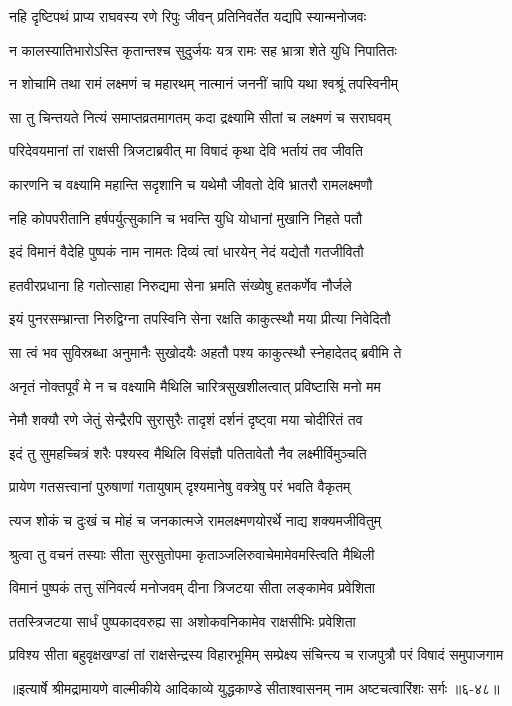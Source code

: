 \twolineshloka
{नहि दृष्टिपथं प्राप्य राघवस्य रणे रिपुः}
{जीवन् प्रतिनिवर्तेत यद्यपि स्यान्मनोजवः} %

\twolineshloka
{न कालस्यातिभारोऽस्ति कृतान्तश्च सुदुर्जयः}
{यत्र रामः सह भ्रात्रा शेते युधि निपातितः} %

\twolineshloka
{न शोचामि तथा रामं लक्ष्मणं च महारथम्}
{नात्मानं जननीं चापि यथा श्वश्रूं तपस्विनीम्} %

\twolineshloka
{सा तु चिन्तयते नित्यं समाप्तव्रतमागतम्}
{कदा द्रक्ष्यामि सीतां च लक्ष्मणं च सराघवम्} %

\twolineshloka
{परिदेवयमानां तां राक्षसी त्रिजटाब्रवीत्}
{मा विषादं कृथा देवि भर्तायं तव जीवति} %

\twolineshloka
{कारणनि च वक्ष्यामि महान्ति सदृशानि च}
{यथेमौ जीवतो देवि भ्रातरौ रामलक्ष्मणौ} %

\twolineshloka
{नहि कोपपरीतानि हर्षपर्युत्सुकानि च}
{भवन्ति युधि योधानां मुखानि निहते पतौ} %

\twolineshloka
{इदं विमानं वैदेहि पुष्पकं नाम नामतः}
{दिव्यं त्वां धारयेन् नेदं यद्येतौ गतजीवितौ} %

\twolineshloka
{हतवीरप्रधाना हि गतोत्साहा निरुद्यमा}
{सेना भ्रमति संख्येषु हतकर्णेव नौर्जले} %

\twolineshloka
{इयं पुनरसम्भ्रान्ता निरुद्विग्ना तपस्विनि}
{सेना रक्षति काकुत्स्थौ मया प्रीत्या निवेदितौ} %

\twolineshloka
{सा त्वं भव सुविस्रब्धा अनुमानैः सुखोदयैः}
{अहतौ पश्य काकुत्स्थौ स्नेहादेतद् ब्रवीमि ते} %

\twolineshloka
{अनृतं नोक्तपूर्वं मे न च वक्ष्यामि मैथिलि}
{चारित्रसुखशीलत्वात् प्रविष्टासि मनो मम} %

\twolineshloka
{नेमौ शक्यौ रणे जेतुं सेन्द्रैरपि सुरासुरैः}
{तादृशं दर्शनं दृष्ट्वा मया चोदीरितं तव} %

\twolineshloka
{इदं तु सुमहच्चित्रं शरैः पश्यस्व मैथिलि}
{विसंज्ञौ पतितावेतौ नैव लक्ष्मीर्विमुञ्चति} %

\twolineshloka
{प्रायेण गतसत्त्वानां पुरुषाणां गतायुषाम्}
{दृश्यमानेषु वक्त्रेषु परं भवति वैकृतम्} %

\twolineshloka
{त्यज शोकं च दुःखं च मोहं च जनकात्मजे}
{रामलक्ष्मणयोरर्थे नाद्य शक्यमजीवितुम्} %

\twolineshloka
{श्रुत्वा तु वचनं तस्याः सीता सुरसुतोपमा}
{कृताञ्जलिरुवाचेमामेवमस्त्विति मैथिली} %

\twolineshloka
{विमानं पुष्पकं तत्तु संनिवर्त्य मनोजवम्}
{दीना त्रिजटया सीता लङ्कामेव प्रवेशिता} %

\twolineshloka
{ततस्त्रिजटया सार्धं पुष्पकादवरुह्य सा}
{अशोकवनिकामेव राक्षसीभिः प्रवेशिता} %

\twolineshloka
{प्रविश्य सीता बहुवृक्षखण्डां तां राक्षसेन्द्रस्य विहारभूमिम्}
{सम्प्रेक्ष्य संचिन्त्य च राजपुत्रौ परं विषादं समुपाजगाम} %


॥इत्यार्षे श्रीमद्रामायणे वाल्मीकीये आदिकाव्ये युद्धकाण्डे सीताश्वासनम् नाम अष्टचत्वारिंशः सर्गः ॥६-४८॥
